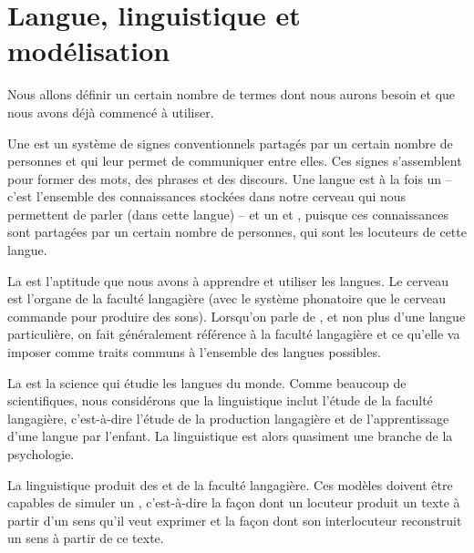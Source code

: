 \pagebreak\section{Langue, linguistique et modélisation}\label{sec:1.1.7}

Nous allons définir un certain nombre de termes dont nous aurons besoin et que nous avons déjà commencé à utiliser.


{Une  est un système de signes conventionnels partagés par un certain nombre de personnes et qui leur permet de communiquer entre elles. Ces signes s’assemblent pour former des mots, des phrases et des discours. Une langue est à la fois un  – c’est l’ensemble des connaissances stockées dans notre cerveau qui nous permettent de parler (dans cette langue) – et un  et , puisque ces connaissances sont partagées par un certain nombre de personnes, qui sont les locuteurs de cette langue.}

{La  est l’aptitude que nous avons à apprendre et utiliser les langues. Le cerveau est l’organe de la faculté langagière (avec le système phonatoire que le cerveau commande pour produire des sons). Lorsqu’on parle de , et non plus d’une langue particulière, on fait généralement référence à la faculté langagière et ce qu’elle va imposer comme traits communs à l’ensemble des langues possibles.}

{La  est la science qui étudie les langues du monde. Comme beaucoup de scientifiques, nous considérons que la linguistique inclut l’étude de la faculté langagière, c’est-à-dire l’étude de la production langagière et de l’apprentissage d’une langue par l’enfant. La linguistique est alors quasiment une branche de la psychologie.}

La linguistique produit des   et de la faculté langagière. Ces modèles doivent être capables de simuler un , c’est-à-dire la façon dont un locuteur produit un texte à partir d’un sens qu’il veut exprimer et la façon dont son interlocuteur reconstruit un sens à partir de ce texte.\largerpage

